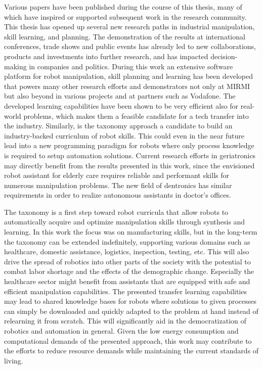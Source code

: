 Various papers have been published during the course of this thesis, many of which have inspired or supported subsequent work in the research community.
This thesis has opened up several new research paths in industrial manipulation, skill learning, and planning.
The demonstration of the results at international conferences, trade shows and public events has already led to new collaborations, products and investments into further research, and has impacted decision-making in companies and politics.
During this work an extensive software platform for robot manipulation, skill planning and learning has been developed that powers many other research efforts and demonstrators not only at MIRMI but also beyond in various projects and at partners such as Vodafone.
The developed learning capabilities have been shown to be very efficient also for real-world problems, which makes them a feasible candidate for a tech transfer into the industry.
Similarly, is the taxonomy approach a candidate to build an industry-backed curriculum of robot skills. This could even in the near future lead into a new programming paradigm for robots where only process knowledge is required to setup automation solutions.
Current research efforts in geriatronics may directly benefit from the results presented in this work, since the envisioned robot assistant for elderly care requires reliable and performant skills for numerous manipulation problems.
The new field of dentronics has similar requirements in order to realize autonomous assistants in doctor’s offices.


The taxonomy is a first step toward robot curricula that allow robots to automatically acquire and optimize manipulation skills through synthesis and learning.
In this work the focus was on manufacturing skills, but in the long-term the taxonomy can be extended indefinitely, supporting various domains such as healthcare, domestic assistance, logistics, inspection, testing, etc.
This will also drive the spread of robotics into other parts of the society with the potential to combat labor shortage and the effects of the demographic change.
Especially the healthcare sector might benefit from assistants that are equipped with safe and efficient manipulation capabilities.
The presented transfer learning capabilities may lead to shared knowledge bases for robots where solutions to given processes can simply be downloaded and quickly adapted to the problem at hand instead of relearning it from scratch.
This will significantly aid in the democratization of robotics and automation in general.
Given the low energy consumption and computational demands of the presented approach, this work may contribute to the efforts to reduce resource demands while maintaining the current standards of living.
